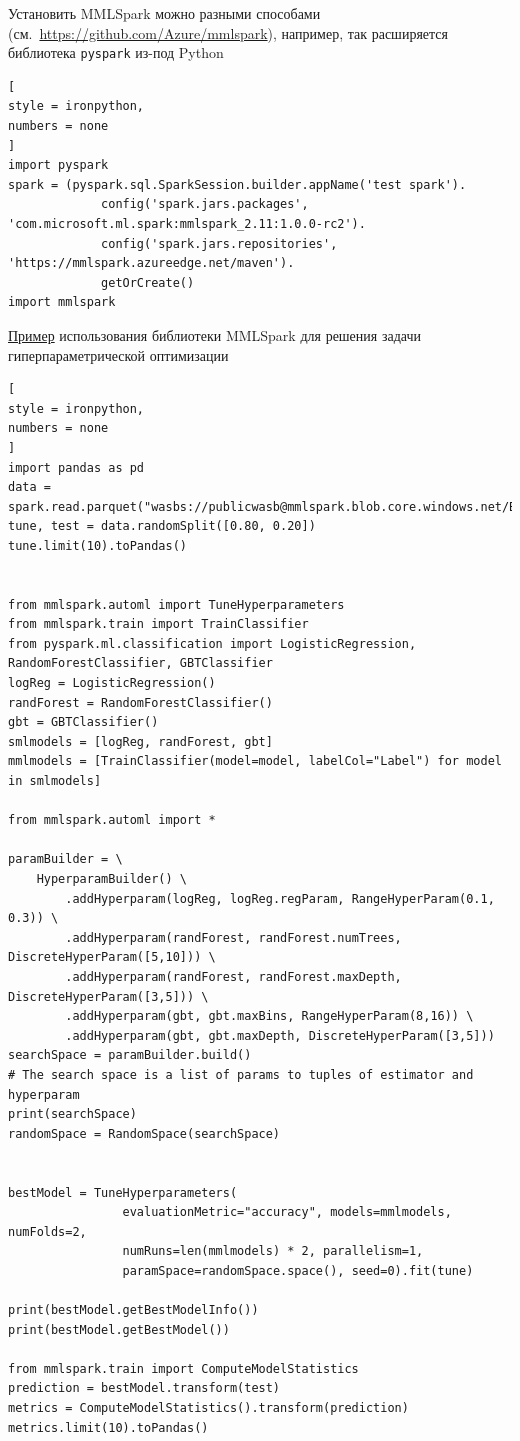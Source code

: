 \documentclass[%
	11pt,
	a4paper,
	utf8,
		]{article}
\begin{document}
Установить MMLSpark можно разными способами (см.~\url{https://github.com/Azure/mmlspark}), например, так расширяется библиотека \texttt{pyspark} из-под Python
\begin{lstlisting}[
style = ironpython,
numbers = none
]
import pyspark
spark = (pyspark.sql.SparkSession.builder.appName('test spark').
             config('spark.jars.packages', 'com.microsoft.ml.spark:mmlspark_2.11:1.0.0-rc2').
             config('spark.jars.repositories', 'https://mmlspark.azureedge.net/maven').
             getOrCreate()
import mmlspark
\end{lstlisting}

\href{https://github.com/Azure/mmlspark/blob/master/notebooks/samples/HyperParameterTuning%20-%20Fighting%20Breast%20Cancer.ipynb}{Пример} использования библиотеки MMLSpark для решения задачи гиперпараметрической оптимизации
\begin{lstlisting}[
style = ironpython,
numbers = none
]
import pandas as pd
data = spark.read.parquet("wasbs://publicwasb@mmlspark.blob.core.windows.net/BreastCancer.parquet")
tune, test = data.randomSplit([0.80, 0.20])
tune.limit(10).toPandas()


from mmlspark.automl import TuneHyperparameters
from mmlspark.train import TrainClassifier
from pyspark.ml.classification import LogisticRegression, RandomForestClassifier, GBTClassifier
logReg = LogisticRegression()
randForest = RandomForestClassifier()
gbt = GBTClassifier()
smlmodels = [logReg, randForest, gbt]
mmlmodels = [TrainClassifier(model=model, labelCol="Label") for model in smlmodels]

from mmlspark.automl import *

paramBuilder = \
    HyperparamBuilder() \
        .addHyperparam(logReg, logReg.regParam, RangeHyperParam(0.1, 0.3)) \
        .addHyperparam(randForest, randForest.numTrees, DiscreteHyperParam([5,10])) \
        .addHyperparam(randForest, randForest.maxDepth, DiscreteHyperParam([3,5])) \
        .addHyperparam(gbt, gbt.maxBins, RangeHyperParam(8,16)) \
        .addHyperparam(gbt, gbt.maxDepth, DiscreteHyperParam([3,5]))
searchSpace = paramBuilder.build()
# The search space is a list of params to tuples of estimator and hyperparam
print(searchSpace)
randomSpace = RandomSpace(searchSpace)


bestModel = TuneHyperparameters(
                evaluationMetric="accuracy", models=mmlmodels, numFolds=2,
                numRuns=len(mmlmodels) * 2, parallelism=1,
                paramSpace=randomSpace.space(), seed=0).fit(tune)

print(bestModel.getBestModelInfo())
print(bestModel.getBestModel())

from mmlspark.train import ComputeModelStatistics
prediction = bestModel.transform(test)
metrics = ComputeModelStatistics().transform(prediction)
metrics.limit(10).toPandas()
\end{lstlisting}
\end{document}
